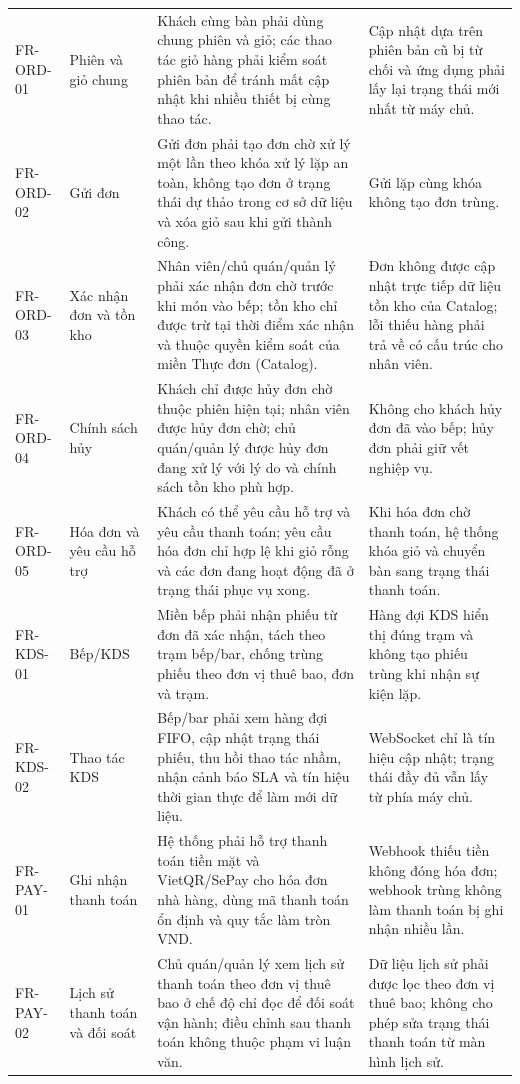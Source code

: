 \begin{longtable}{@{}>{\raggedright\arraybackslash}p{}>{\raggedright\arraybackslash}p{}>{\raggedright\arraybackslash}p{}>{\raggedright\arraybackslash}p{}@{}}
FR-ORD-01 & Phiên và giỏ chung & Khách cùng bàn phải dùng chung phiên và giỏ; các thao tác giỏ hàng phải kiểm soát phiên bản để tránh mất cập nhật khi nhiều thiết bị cùng thao tác. & Cập nhật dựa trên phiên bản cũ bị từ chối và ứng dụng phải lấy lại trạng thái mới nhất từ máy chủ. \\
\addlinespace
FR-ORD-02 & Gửi đơn & Gửi đơn phải tạo đơn chờ xử lý một lần theo khóa xử lý lặp an toàn, không tạo đơn ở trạng thái dự thảo trong cơ sở dữ liệu và xóa giỏ sau khi gửi thành công. & Gửi lặp cùng khóa không tạo đơn trùng. \\
\addlinespace
FR-ORD-03 & Xác nhận đơn và tồn kho & Nhân viên/chủ quán/quản lý phải xác nhận đơn chờ trước khi món vào bếp; tồn kho chỉ được trừ tại thời điểm xác nhận và thuộc quyền kiểm soát của miền Thực đơn (Catalog). & Đơn không được cập nhật trực tiếp dữ liệu tồn kho của Catalog; lỗi thiếu hàng phải trả về có cấu trúc cho nhân viên. \\
\addlinespace
FR-ORD-04 & Chính sách hủy & Khách chỉ được hủy đơn chờ thuộc phiên hiện tại; nhân viên được hủy đơn chờ; chủ quán/quản lý được hủy đơn đang xử lý với lý do và chính sách tồn kho phù hợp. & Không cho khách hủy đơn đã vào bếp; hủy đơn phải giữ vết nghiệp vụ. \\
\addlinespace
FR-ORD-05 & Hóa đơn và yêu cầu hỗ trợ & Khách có thể yêu cầu hỗ trợ và yêu cầu thanh toán; yêu cầu hóa đơn chỉ hợp lệ khi giỏ rỗng và các đơn đang hoạt động đã ở trạng thái phục vụ xong. & Khi hóa đơn chờ thanh toán, hệ thống khóa giỏ và chuyển bàn sang trạng thái thanh toán. \\
\addlinespace
FR-KDS-01 & Bếp/KDS & Miền bếp phải nhận phiếu từ đơn đã xác nhận, tách theo trạm bếp/bar, chống trùng phiếu theo đơn vị thuê bao, đơn và trạm. & Hàng đợi KDS hiển thị đúng trạm và không tạo phiếu trùng khi nhận sự kiện lặp. \\
\addlinespace
FR-KDS-02 & Thao tác KDS & Bếp/bar phải xem hàng đợi FIFO, cập nhật trạng thái phiếu, thu hồi thao tác nhầm, nhận cảnh báo SLA và tín hiệu thời gian thực để làm mới dữ liệu. & WebSocket chỉ là tín hiệu cập nhật; trạng thái đầy đủ vẫn lấy từ phía máy chủ. \\
\addlinespace
FR-PAY-01 & Ghi nhận thanh toán & Hệ thống phải hỗ trợ thanh toán tiền mặt và VietQR/SePay cho hóa đơn nhà hàng, dùng mã thanh toán ổn định và quy tắc làm tròn VND. & Webhook thiếu tiền không đóng hóa đơn; webhook trùng không làm thanh toán bị ghi nhận nhiều lần. \\
\addlinespace
FR-PAY-02 & Lịch sử thanh toán và đối soát & Chủ quán/quản lý xem lịch sử thanh toán theo đơn vị thuê bao ở chế độ chỉ đọc để đối soát vận hành; điều chỉnh sau thanh toán không thuộc phạm vi luận văn. & Dữ liệu lịch sử phải được lọc theo đơn vị thuê bao; không cho phép sửa trạng thái thanh toán từ màn hình lịch sử. \\

\end{longtable}
